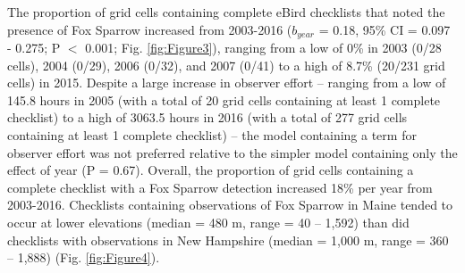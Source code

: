 \documentclass[fleqn,10pt,lineno]{wlpeerj} %
\begin{document}
The proportion of grid cells containing complete eBird checklists that noted the presence of Fox Sparrow increased from 2003-2016 ($b_{year}$ = 0.18, 95\% CI = 0.097 - 0.275; P $<$ 0.001; Fig. \ref{fig:Figure3}), ranging from a low of 0\% in 2003 (0/28 cells), 2004 (0/29), 2006 (0/32), and 2007 (0/41) to a high of 8.7\% (20/231 grid cells) in 2015. Despite a large increase in observer effort – ranging from a low of 145.8 hours in 2005 (with a total of 20 grid cells containing at least 1 complete checklist) to a high of 3063.5 hours in 2016 (with a total of 277 grid cells containing at least 1 complete checklist) – the model containing a term for observer effort was not preferred relative to the simpler model containing only the effect of year (P = 0.67). Overall, the proportion of grid cells containing a complete checklist with a Fox Sparrow detection increased 18\% per year from 2003-2016. Checklists containing observations of Fox Sparrow in Maine tended to occur at lower elevations (median = 480 m, range = 40 – 1,592) than did checklists with observations in New Hampshire (median = 1,000 m, range = 360 – 1,888) (Fig. \ref{fig:Figure4}). 
\end{document}
